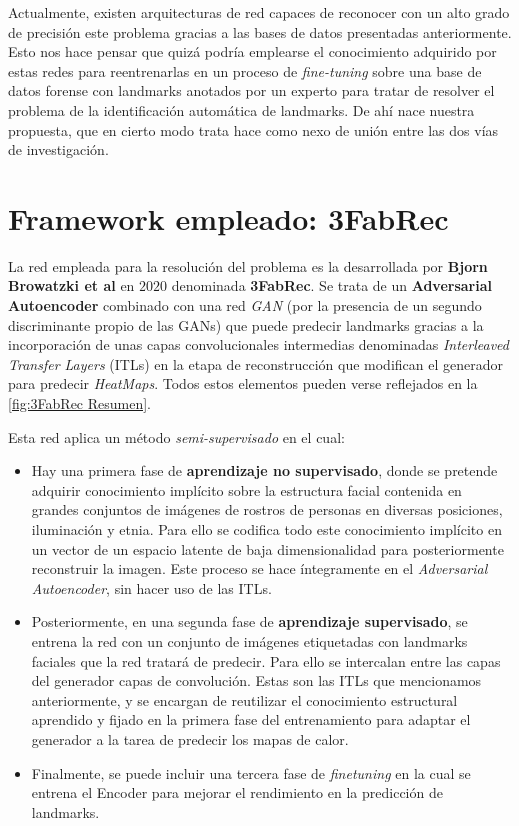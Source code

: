    \medskip

    \noindent Actualmente, existen arquitecturas de red capaces de reconocer con un alto grado de precisión este problema gracias a las bases de datos presentadas anteriormente. Esto nos hace pensar que quizá podría emplearse el conocimiento adquirido por estas redes para reentrenarlas en un proceso de \textit{fine-tuning} sobre una base de datos forense con landmarks anotados por un experto para tratar de resolver el problema de la identificación automática de landmarks. De ahí nace nuestra propuesta, que en cierto modo trata hace como nexo de unión entre las dos vías de investigación. 


\section{Framework empleado: 3FabRec }
        \noindent La red empleada para la resolución del problema es la desarrollada por \textbf{Bjorn Browatzki et al} en $2020$ \cite{browatzki20203fabrec} denominada \textbf{3FabRec}. Se trata de un \textbf{Adversarial Autoencoder} combinado con una red \textit{GAN} (por la presencia de un segundo discriminante propio de las GANs) que puede predecir landmarks gracias a la incorporación de unas capas convolucionales intermedias denominadas \textit{Interleaved Transfer Layers} (ITLs) en la etapa de reconstrucción que modifican el generador para predecir \textit{HeatMaps}. Todos estos elementos pueden verse reflejados en la \autoref{fig:3FabRec Resumen}.      

        \medskip

        \noindent Esta red aplica un método \textit{semi-supervisado} en el cual:

        \begin{itemize}
            \item Hay una primera fase de \textbf{aprendizaje no supervisado}, donde se pretende adquirir conocimiento implícito sobre la estructura facial contenida en grandes conjuntos de imágenes de rostros de personas en diversas posiciones, iluminación y etnia. Para ello se codifica todo este conocimiento implícito en un vector de un espacio latente de baja dimensionalidad para posteriormente reconstruir la imagen. Este proceso se hace íntegramente en el \textit{Adversarial Autoencoder}, sin hacer uso de las ITLs.
            \item Posteriormente, en una segunda fase de \textbf{aprendizaje supervisado}, se entrena la red con un conjunto de imágenes etiquetadas con landmarks faciales que la red tratará de predecir. Para ello se intercalan entre las capas del generador capas de convolución. Estas son las ITLs que mencionamos anteriormente, y se encargan de reutilizar el conocimiento estructural aprendido y fijado en la primera fase del entrenamiento para adaptar el generador a la tarea de predecir los mapas de calor.
            \item Finalmente, se puede incluir una tercera fase de \textit{finetuning} en la cual se entrena el Encoder para mejorar el rendimiento en la predicción de landmarks.
        \end{itemize} 

